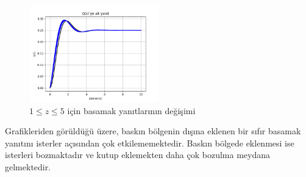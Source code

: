 \begin{figure}[!htb]
    \centering
    \includegraphics[width=0.5\textwidth]{plot4}
    \caption{$1\leq z\leq 5$ için basamak yanıtlarının değişimi}\label{fig:plot4}
\end{figure}

Grafikleriden görüldüğü üzere, baskın bölgenin dışına eklenen bir sıfır basamak yanıtını isterler açısından çok etkilememektedir. Baskın bölgede eklenmesi ise isterleri bozmaktadır ve kutup eklemekten daha çok bozulma meydana gelmektedir.